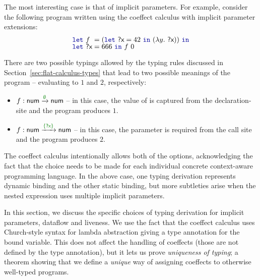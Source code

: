 The most interesting case is that of implicit parameters. For example, consider the following
program written using the coeffect calculus with implicit parameter extensions:
%
\begin{equation*}
\begin{array}{l}
\kvd{let}~f~= (\kvd{let}~\ident{?x}=42~\kvd{in}~(\lambda y.~\ident{?x}))~\kvd{in} \\[-0.2em]
\kvd{let}~\ident{?x}=666~\kvd{in}~f~0 \\[-0.2em]
\end{array}
\end{equation*}

\noindent
There are two possible typings allowed by the typing rules discussed in Section~\ref{sec:flat-calculus-types}
that lead to two possible meanings of the program -- evaluating to $1$ and $2$, respectively:
%
\begin{itemize}
  \item $f : \ident{num} \xrightarrow{\cclrd{\emptyset}} \ident{num}$ -- in this case, the value
    of  is captured from the declaration-site and the program produces $1$.
  \item $f : \ident{num} \xrightarrow{\cclrd{\{ \ident{?x} \}}} \ident{num}$ -- in this case, the
    parameter  is required from the call site and the program produces $2$.
\end{itemize}
%
The coeffect calculus intentionally allows both of the options, acknowledging the fact that the
choice needs to be made for each individual concrete context-aware programming language. In the
above case, one typing derivation represents dynamic binding and the other static binding, but
more subtleties arise when the nested expression uses multiple implicit parameters.

In this section, we discuss the specific choices of typing derivation for implicit parameters,
dataflow and liveness. We use the fact that the coeffect calculus uses Church-style syntax for
lambda abstraction giving a type annotation for the bound variable. This does not affect the
handling of coeffects (those are not defined by the type annotation), but it lets us prove
\emph{uniqueness of typing}; a theorem showing that we define a \emph{unique} way of assigning
coeffects to otherwise well-typed programs.


